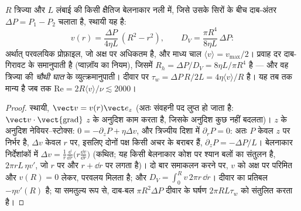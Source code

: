 \begin{proposition}[नली में प्वाज़ॉय प्रवाह]\label{prop:b2:viscous-flows:poiseuille}
$R$ त्रिज्या और $L$ लंबाई की किसी क्षैतिज बेलनाकार नली में, जिसे उसके
सिरों के बीच दाब-अंतर $\Delta P = P_1 - P_2$ चलाता है, स्थायी
 यह है:
\[
v(r) = \frac{\Delta P}{4\eta L}\,(R^2 - r^2) , \qquad
D_V = \frac{\pi R^4}{8\eta L}\,\Delta P :
\]
अर्थात् परवलयिक प्रोफ़ाइल, जो अक्ष पर अधिकतम है, और माध्य चाल
$\langle v\rangle = v_{\max}/2$। प्रवाह दर
दाब-गिरावट के समानुपाती है (प्वाज़ॉय का नियम), जिसमें \emph{}
$R_h = \Delta P/D_V = 8\eta L/\pi R^4$ है --- और वह त्रिज्या की \emph{चौथी घात}
के व्युत्क्रमानुपाती। दीवार पर  $\tau_w = \Delta P\,R/2L = 4\eta\langle v
\rangle/R$ है। यह तब तक मान्य है जब तक $\mathrm{Re} = 2R\langle v\rangle/\nu \lesssim 2000$।
\end{proposition}

\begin{proof}
स्थायी, $\vect v = v(r)\vect e_z$ (अतः संवहनी पद लुप्त हो जाता है: $\vect v
\cdot\operatorname{\vect{grad}}$ $z$ के अनुदिश काम करता है, जिसके अनुदिश कुछ
नहीं बदलता)। $z$ के अनुदिश नेवियर--स्टोक्स: $0 = -\partial_zP + \eta\Delta v$, और
त्रिज्यीय दिशा में $\partial_rP = 0$: अतः $P$ केवल $z$ पर निर्भर है, $\Delta v$ केवल $r$ पर, इसलिए
दोनों पक्ष किसी अचर के बराबर हैं, $\partial_zP = -\Delta P/L$। बेलनाकार
निर्देशांकों में $\Delta v = \frac1r\frac{\dd}{\dd r}\bigl(r\frac{\dd v}{\dd r}\bigr)$
(कथित; यह किसी बेलनाकार कोश पर श्यान बलों का संतुलन है,
$2\pi rL\,\eta v'$, जो $r$ पर और $r + \dd r$ पर लगता है)। दो बार समाकलन करने पर, $v$
को अक्ष पर परिमित और $v(R) = 0$ लेकर, परवलय मिलता है; और $D_V = \int_0^Rv\,2\pi
r\,\dd r$। दीवार का प्रतिबल $-\eta v'(R)$ है; या समतुल्य रूप से, दाब-बल
$\pi R^2\Delta P$ दीवार के घर्षण $2\pi RL\tau_w$ को संतुलित करता है।
\end{proof}

